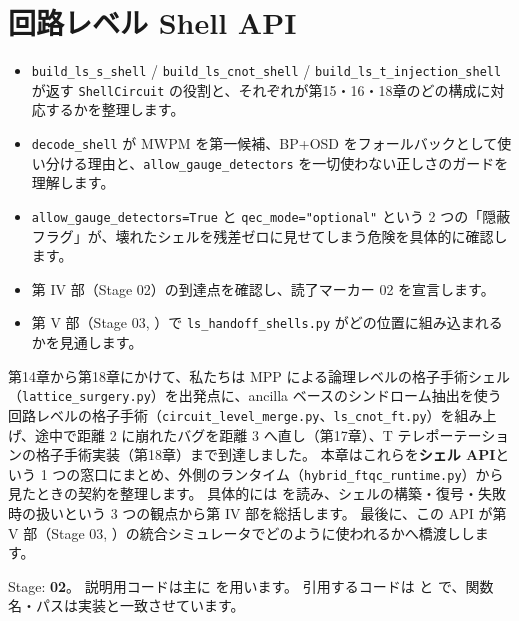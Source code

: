 \chapter{回路レベル Shell API}\label{ch:shells}

\begin{chaptergoal}
  \begin{itemize}
  \item \texttt{build\_ls\_s\_shell} / \texttt{build\_ls\_cnot\_shell} / \texttt{build\_ls\_t\_injection\_shell} が返す \texttt{ShellCircuit} の役割と、それぞれが第15・16・18章のどの構成に対応するかを整理します。
  \item \texttt{decode\_shell} が MWPM を第一候補、BP+OSD をフォールバックとして使い分ける理由と、\texttt{allow\_gauge\_detectors} を一切使わない正しさのガードを理解します。
  \item \texttt{allow\_gauge\_detectors=True} と \texttt{qec\_mode="optional"} という 2 つの「隠蔽フラグ」が、壊れたシェルを残差ゼロに見せてしまう危険を具体的に確認します。
  \item 第 IV 部（Stage 02）の到達点を確認し、読了マーカー 02 を宣言します。
  \item 第 V 部（Stage 03, ）で \texttt{ls\_handoff\_shells.py} がどの位置に組み込まれるかを見通します。
  \end{itemize}
\end{chaptergoal}

第14章から第18章にかけて、私たちは MPP による論理レベルの格子手術シェル（\texttt{lattice\_surgery.py}）を出発点に、ancilla ベースのシンドローム抽出を使う回路レベルの格子手術（\texttt{circuit\_level\_merge.py}、\texttt{ls\_cnot\_ft.py}）を組み上げ、途中で距離 2 に崩れたバグを距離 3 へ直し（第17章）、T テレポーテーションの格子手術実装（第18章）まで到達しました。
本章はこれらを\textbf{シェル API}という 1 つの窓口にまとめ、外側のランタイム（\texttt{hybrid\_ftqc\_runtime.py}）から見たときの契約を整理します。
具体的には  を読み、シェルの構築・復号・失敗時の扱いという 3 つの観点から第 IV 部を総括します。
最後に、この API が第 V 部（Stage 03, ）の統合シミュレータでどのように使われるかへ橋渡しします。

\begin{notebox}
  Stage: \textbf{02}。
  説明用コードは主に  を用います。
  引用するコードは  と  で、関数名・パスは実装と一致させています。
\end{notebox}

